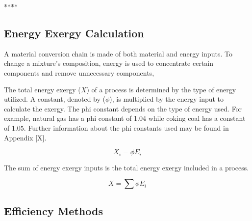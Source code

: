 \documentclass[energies,article,submit,pdftex,moreauthors]{Definitions/mdpi}
\begin{document}
****




\subsection{Energy Exergy Calculation}
\label{ssec: energy exergy calculation}

A material conversion chain
is made of both material and energy inputs.
To change a mixture's composition,
energy is used
to concentrate certain components
and remove unnecessary components,

The total energy exergy ($X$)
of a process
is determined by the type of energy utilized.
A constant, denoted by ($\phi$),
is multiplied by the energy input
to calculate the exergy.
The phi constant depends on the type of energy used.
For example, natural gas has a phi constant
of 1.04
while coking coal has a constant
of 1.05.
Further information about the phi constants used
may be found in Appendix [X].

\begin{equation}\label{eq:energy_exergy_definition}
  X_{i} = \phi E_{i}
\end{equation}

The sum of energy exergy inputs is the total energy exergy
included in a process.

\begin{equation}\label{eq:total_energy_exergy_definition}
  X = \sum{\phi E_{i}}
\end{equation}




\subsection{Efficiency Methods}
\label{ssec: efficiency_methods_and_calculations}
\end{document}

